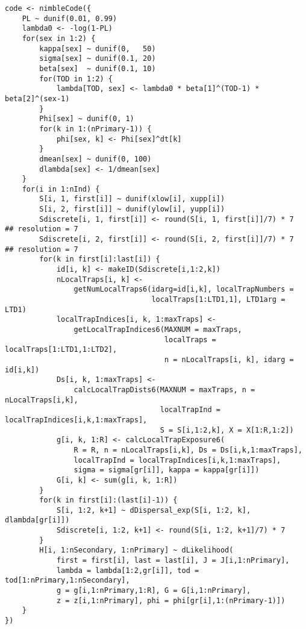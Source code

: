 \begin{singlespace}
\begin{small}
\begin{verbatim}
code <- nimbleCode({
    PL ~ dunif(0.01, 0.99)
    lambda0 <- -log(1-PL)
    for(sex in 1:2) {
        kappa[sex] ~ dunif(0,   50)
        sigma[sex] ~ dunif(0.1, 20)
        beta[sex]  ~ dunif(0.1, 10)
        for(TOD in 1:2) {
            lambda[TOD, sex] <- lambda0 * beta[1]^(TOD-1) * beta[2]^(sex-1)
        }
        Phi[sex] ~ dunif(0, 1)
        for(k in 1:(nPrimary-1)) {
            phi[sex, k] <- Phi[sex]^dt[k]
        }
        dmean[sex] ~ dunif(0, 100)
        dlambda[sex] <- 1/dmean[sex]
    }
    for(i in 1:nInd) {
        S[i, 1, first[i]] ~ dunif(xlow[i], xupp[i])
        S[i, 2, first[i]] ~ dunif(ylow[i], yupp[i])
        Sdiscrete[i, 1, first[i]] <- round(S[i, 1, first[i]]/7) * 7   ## resolution = 7
        Sdiscrete[i, 2, first[i]] <- round(S[i, 2, first[i]]/7) * 7   ## resolution = 7
        for(k in first[i]:last[i]) {
            id[i, k] <- makeID(Sdiscrete[i,1:2,k])
            nLocalTraps[i, k] <- 
                getNumLocalTraps6(idarg=id[i,k], localTrapNumbers =
                                  localTraps[1:LTD1,1], LTD1arg = LTD1)
            localTrapIndices[i, k, 1:maxTraps] <- 
                getLocalTrapIndices6(MAXNUM = maxTraps, 
                                     localTraps = localTraps[1:LTD1,1:LTD2], 
                                     n = nLocalTraps[i, k], idarg = id[i,k])
            Ds[i, k, 1:maxTraps] <- 
                calcLocalTrapDists6(MAXNUM = maxTraps, n = nLocalTraps[i,k], 
                                    localTrapInd = localTrapIndices[i,k,1:maxTraps],
                                    S = S[i,1:2,k], X = X[1:R,1:2])
            g[i, k, 1:R] <- calcLocalTrapExposure6(
                R = R, n = nLocalTraps[i,k], Ds = Ds[i,k,1:maxTraps], 
                localTrapInd = localTrapIndices[i,k,1:maxTraps], 
                sigma = sigma[gr[i]], kappa = kappa[gr[i]])
            G[i, k] <- sum(g[i, k, 1:R])
        }
        for(k in first[i]:(last[i]-1)) {
            S[i, 1:2, k+1] ~ dDispersal_exp(S[i, 1:2, k], dlambda[gr[i]])
            Sdiscrete[i, 1:2, k+1] <- round(S[i, 1:2, k+1]/7) * 7
        }
        H[i, 1:nSecondary, 1:nPrimary] ~ dLikelihood(
            first = first[i], last = last[i], J = J[i,1:nPrimary],
            lambda = lambda[1:2,gr[i]], tod = tod[1:nPrimary,1:nSecondary],
            g = g[i,1:nPrimary,1:R], G = G[i,1:nPrimary],
            z = z[i,1:nPrimary], phi = phi[gr[i],1:(nPrimary-1)])
    }
})
\end{verbatim}
\end{small}
\end{singlespace}




